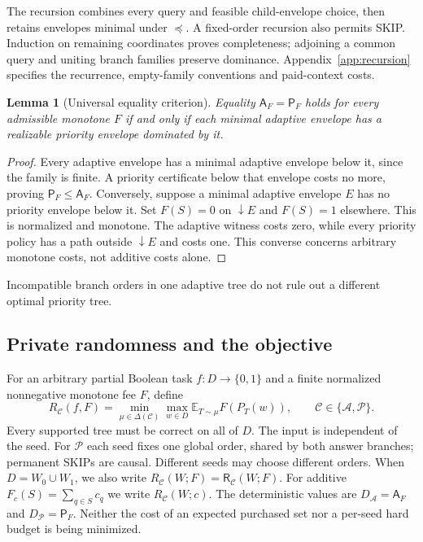 \documentclass[pdflatex,sn-mathphys-num]{sn-jnl}
\newcommand{\A}{\mathsf{A}}
\newcommand{\Pcost}{\mathsf{P}}
\newcommand{\down}{\mathop{\downarrow}}
\newcommand{\RR}{\mathsf{R}}
\theoremstyle{thmstyleone}
\newtheorem{lemma}[theorem]{Lemma}
\theoremstyle{thmstylethree}
\theoremstyle{thmstyletwo}
\begin{document}
The recursion combines every query and feasible child-envelope choice, then retains envelopes minimal under $\preceq$. A fixed-order recursion also permits SKIP. Induction on remaining coordinates proves completeness; adjoining a common query and uniting branch families preserve dominance. Appendix~\ref{app:recursion} specifies the recurrence, empty-family conventions and paid-context costs.

\begin{lemma}[Universal equality criterion]\label{lem:criterion}
Equality $\A_F=\Pcost_F$ holds for every admissible monotone $F$ if and only if each minimal adaptive envelope has a realizable priority envelope dominated by it.
\end{lemma}
\begin{proof}
Every adaptive envelope has a minimal adaptive envelope below it, since the family is finite. A priority certificate below that envelope costs no more, proving $\Pcost_F\leq\A_F$. Conversely, suppose a minimal adaptive envelope $E$ has no priority envelope below it. Set $F(S)=0$ on $\down E$ and $F(S)=1$ elsewhere. This is normalized and monotone. The adaptive witness costs zero, while every priority policy has a path outside $\down E$ and costs one. This converse concerns arbitrary monotone costs, not additive costs alone.
\end{proof}

Incompatible branch orders in one adaptive tree do not rule out a different optimal priority tree.


\subsection{Private randomness and the objective}
For an arbitrary partial Boolean task $f:D\to\{0,1\}$ and a finite
normalized nonnegative monotone fee $F$, define
\[
 R_{\mathcal C}(f,F)=\min_{\mu\in\Delta(\mathcal C)}\max_{w\in D}
      \mathbb E_{T\sim\mu}F(P_T(w)),
 \qquad\mathcal C\in\{\mathcal A,\mathcal P\}.
\]
Every supported tree must be correct on all of $D$. The input is
independent of the seed. For $\mathcal P$ each seed fixes one global
order, shared by both answer branches; permanent SKIPs are causal.
Different seeds may choose different orders. When $D=W_0\cup W_1$,
we also write $R_{\mathcal C}(W;F)=\RR_{\mathcal C}(W;F)$.
For additive $F_c(S)=\sum_{q\in S}c_q$ we write $R_{\mathcal C}(W;c)$.
The deterministic values are $D_{\mathcal A}=\A_F$ and
$D_{\mathcal P}=\Pcost_F$. Neither the cost of an expected purchased
set nor a per-seed hard budget is being minimized.
\end{document}
